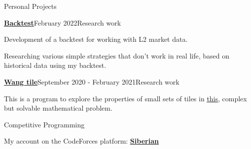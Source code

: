\documentclass{resume} %
\begin{document}

\begin{rSection}{Personal Projects}

\begin{rSubsection}{\href{https://github.com/ElderlyPassionFruit/backtest-model}{\underline{\textbf{Backtest}}}}{February 2022}{Research work}{}

\item Development of a backtest for working with L2 market data.
\item Researching various simple strategies that don't work in real life, based on historical data using my backtest.
\end{rSubsection}

\begin{rSubsection}{\href{https://github.com/ElderlyPassionFruit/wang-tile}{\underline{\textbf{Wang tile}}}}{September 2020 - February 2021}{Research work}{}
\item This is a program to explore the properties of small sets of tiles in \href{https://en.wikipedia.org/wiki/Wang_tile}{\underline{this}}, complex but solvable mathematical problem.
\end{rSubsection}

\end{rSection}


\begin{rSection}{Competitive Programming}

My account on the CodeForces platform: \href{https://codeforces.com/profile/Siberian}{\underline{\textbf{Siberian}}}



\end{rSection}
\end{document}
